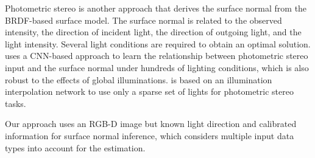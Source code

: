 Photometric stereo is another approach that derives the surface normal from the BRDF-based surface model. The surface normal is related to the observed intensity, the direction of incident light, the direction of outgoing light, and the light intensity. Several light conditions are required to obtain an optimal solution. \cite{CNN-PS} uses a CNN-based approach to learn the relationship between photometric stereo input and the surface normal under hundreds of lighting conditions, which is also robust to the effects of global illuminations. \cite{spline-net} is based on an illumination interpolation network to use only a sparse set of lights for photometric stereo tasks.


Our approach uses an RGB-D image but known light direction and calibrated information for surface normal inference, which considers multiple input data types into account for the estimation. 










